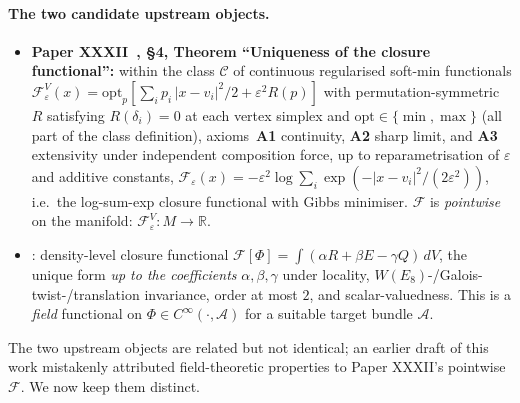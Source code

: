 \documentclass[12pt]{article}
\newcommand{\Fcal}{\mathcal{F}}
\begin{document}
\paragraph{The two candidate upstream objects.}
\begin{itemize}
\item \textbf{Paper XXXII~\cite{SmartXXXII}, \S 4, Theorem
``Uniqueness of the closure functional'':} within the class
$\mathcal{C}$ of continuous regularised soft-min functionals
$\Fcal^V_\varepsilon(x) = \mathrm{opt}_p\!\left[
\sum_i p_i\, |x - v_i|^2/2 + \varepsilon^2 R(p)\right]$ with
permutation-symmetric $R$ satisfying $R(\delta_i) = 0$ at each
vertex simplex and $\mathrm{opt} \in \{\min, \max\}$ (all part of
the class definition), axioms~\textbf{A1} continuity, \textbf{A2}
sharp limit, and \textbf{A3} extensivity under independent
composition force, up to reparametrisation of $\varepsilon$ and
additive constants,
$\Fcal_\varepsilon(x) = -\varepsilon^2 \log \sum_i \exp(-|x - v_i|^2/(2\varepsilon^2))$,
i.e.~the log-sum-exp closure functional with Gibbs minimiser. $\Fcal$
is \emph{pointwise} on the manifold: $\Fcal^V_\varepsilon : M \to
\mathbb{R}$.
\item \textbf{\cite[\S F2]{CascadeFoundations}}: density-level
closure functional $\Fcal[\Phi] = \int (\alpha R + \beta E - \gamma Q)\,dV$,
the unique form \emph{up to the coefficients} $\alpha, \beta, \gamma$
under locality, $W(E_8)$-/Galois-twist-/translation invariance,
order at most $2$, and scalar-valuedness. This is a \emph{field}
functional on $\Phi \in C^\infty(\cdot, \mathcal{A})$ for a
suitable target bundle $\mathcal{A}$.
\end{itemize}
The two upstream objects are related but not identical; an earlier
draft of this work mistakenly attributed field-theoretic properties
to Paper XXXII's pointwise $\Fcal$. We now keep them distinct.
\end{document}
